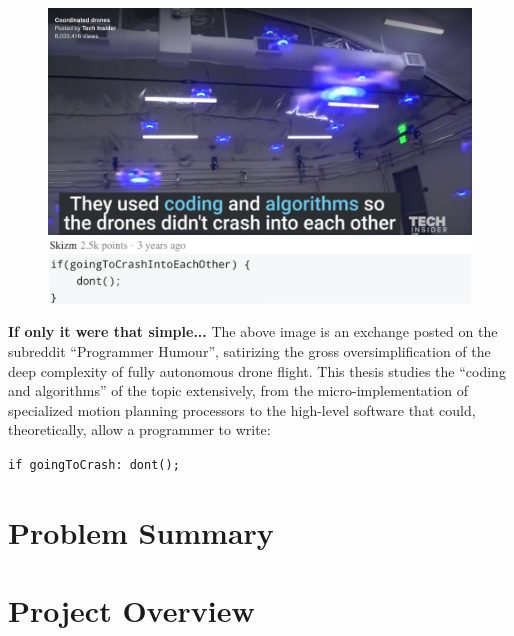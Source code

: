 
\begin{figure}[H]
\begin{center}
\includegraphics[width=0.8\linewidth]{chapters/chapter1/img/ifgoingtocrash.png}\\
\includegraphics[width=0.8\linewidth]{chapters/chapter1/img/ifgoingtocrashcode.png} \\
\end{center}
\end{figure}

\textbf{If only it were that simple...} The above image is an exchange posted on the subreddit ``Programmer Humour'', satirizing the gross oversimplification of the deep complexity of fully autonomous drone flight. This thesis studies the ``coding and algorithms'' of the topic extensively, from the micro-implementation of specialized motion planning processors to the high-level software that could, theoretically, allow a programmer to write: 

    \begin{center}
    \texttt{if goingToCrash: dont();}
    \end{center}

\section{Problem Summary}
    

\newpage
\section{Project Overview}
\label{section:projectOverview}
    



\newpage
